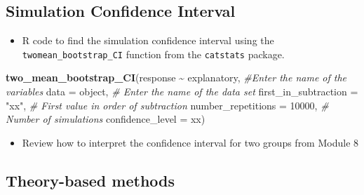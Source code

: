 \documentclass[
]{report}
\newenvironment{Shaded}{\begin{snugshade}}{\end{snugshade}}
\newcommand{\AttributeTok}[1]{\textcolor[rgb]{0.13,0.29,0.53}{#1}}
\newcommand{\CommentTok}[1]{\textcolor[rgb]{0.56,0.35,0.01}{\textit{#1}}}
\newcommand{\DecValTok}[1]{\textcolor[rgb]{0.00,0.00,0.81}{#1}}
\newcommand{\FunctionTok}[1]{\textcolor[rgb]{0.13,0.29,0.53}{\textbf{#1}}}
\newcommand{\NormalTok}[1]{#1}
\newcommand{\SpecialCharTok}[1]{\textcolor[rgb]{0.81,0.36,0.00}{\textbf{#1}}}
\newcommand{\StringTok}[1]{\textcolor[rgb]{0.31,0.60,0.02}{#1}}
\providecommand{\tightlist}{%
  \setlength{\itemsep}{0pt}\setlength{\parskip}{0pt}}
\begin{document}
\subsection*{Simulation Confidence Interval}\label{simulation-confidence-interval-1}

\begin{itemize}
\tightlist
\item
  R code to find the simulation confidence interval using the \texttt{twomean\_bootstrap\_CI} function from the \texttt{catstats} package.
\end{itemize}

\begin{Shaded}
\begin{Highlighting}[]
\FunctionTok{two\_mean\_bootstrap\_CI}\NormalTok{(response }\SpecialCharTok{\textasciitilde{}}\NormalTok{ explanatory, }\CommentTok{\#Enter the name of the variables}
                      \AttributeTok{data =}\NormalTok{ object,  }\CommentTok{\# Enter the name of the data set}
                      \AttributeTok{first\_in\_subtraction =} \StringTok{"xx"}\NormalTok{, }\CommentTok{\# First value in order of subtraction}
                      \AttributeTok{number\_repetitions =} \DecValTok{10000}\NormalTok{,  }\CommentTok{\# Number of simulations}
                      \AttributeTok{confidence\_level =}\NormalTok{ xx)}
\end{Highlighting}
\end{Shaded}

\begin{itemize}
\tightlist
\item
  Review how to interpret the confidence interval for two groups from Module 8
\end{itemize}

\subsection*{Theory-based methods}\label{theory-based-methods-4}
\end{document}
